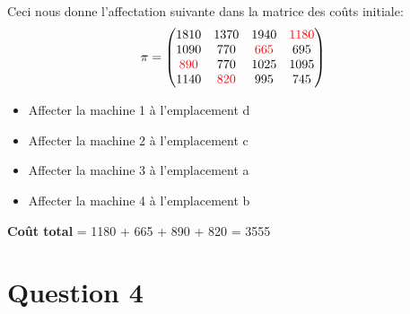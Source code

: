 \documentclass{article}
\begin{document}
Ceci nous donne l'affectation suivante dans la matrice des coûts initiale:
$$\pi=\begin{pmatrix}
1810 & 1370 & 1940 & \textcolor{red}{1180} \\
1090 & 770 & \textcolor{red}{665} & 695\\
\textcolor{red}{890} & 770 & 1025 & 1095\\
1140 & \textcolor{red}{820} & 995 & 745
\end{pmatrix}$$

\begin{itemize}
    \item Affecter la machine 1 à l'emplacement d 
    \item Affecter la machine 2 à l'emplacement c
    \item Affecter la machine 3 à l'emplacement a 
    \item Affecter la machine 4 à l'emplacement b 
\end{itemize}

\textbf{Coût total} = 1180 + 665 + 890 + 820 = 3555




\section*{Question 4}
\end{document}
